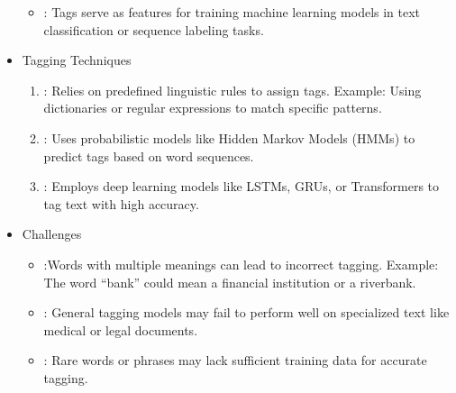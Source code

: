 \documentclass[letterpaper,11pt,english]{sphinxmanual}
\begin{document}
\begin{itemize}
\begin{itemize}
\item {} 
\sphinxAtStartPar
{}: Tags serve as features for training machine learning models in
text classification or sequence labeling tasks.

\end{itemize}

\item {} 
\sphinxAtStartPar
Tagging Techniques
\begin{enumerate}
%
\item {} 
\sphinxAtStartPar
{}: Relies on predefined linguistic rules to assign tags.
Example: Using dictionaries or regular expressions to match specific patterns.

\item {} 
\sphinxAtStartPar
{}: Uses probabilistic models like Hidden Markov Models (HMMs)
to predict tags based on word sequences.

\item {} 
\sphinxAtStartPar
{}: Employs deep learning models like LSTMs, GRUs, or Transformers
to tag text with high accuracy.

\end{enumerate}

\item {} 
\sphinxAtStartPar
Challenges
\begin{itemize}
\item {} 
\sphinxAtStartPar
{}:Words with multiple meanings can lead to incorrect tagging.
Example: The word “bank” could mean a financial institution or a riverbank.

\item {} 
\sphinxAtStartPar
{}: General tagging models may fail to perform well on specialized text
like medical or legal documents.

\item {} 
\sphinxAtStartPar
{}: Rare words or phrases may lack sufficient training data for accurate tagging.

\end{itemize}

\end{itemize}
\end{document}
